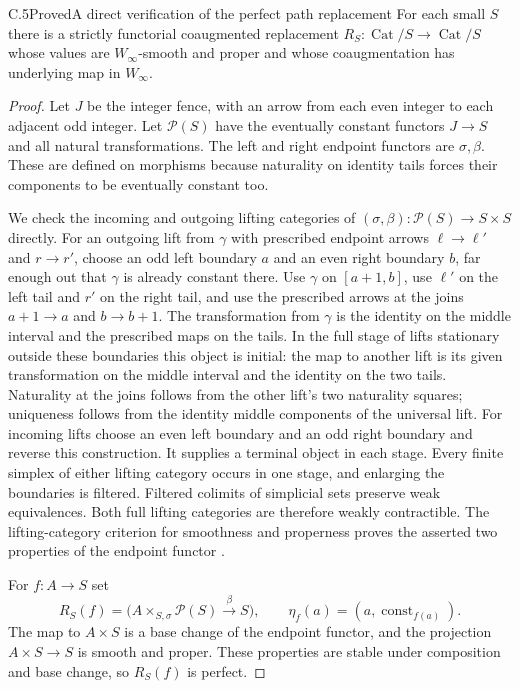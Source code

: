 \begin{claim}{C.5}{Proved}{A direct verification of the perfect path replacement}
For each small $S$ there is a strictly functorial coaugmented
replacement $R_S:\operatorname{Cat}/S\to\operatorname{Cat}/S$
whose values are $W_\infty$-smooth and proper and whose
coaugmentation has underlying map in $W_\infty$.
\end{claim}
\begin{proof}
Let $J$ be the integer fence, with an arrow from each even integer
to each adjacent odd integer. Let $\mathcal P(S)$ have the
eventually constant functors $J\to S$ and all natural transformations.
The left and right endpoint functors are $\sigma,\beta$. These
are defined on morphisms because naturality on identity tails
forces their components to be eventually constant too.

We check the incoming and outgoing lifting categories of
$(\sigma,\beta):\mathcal P(S)\to S\times S$ directly. For an
outgoing lift from $\gamma$ with prescribed endpoint arrows
$\ell\to\ell'$ and $r\to r'$, choose an odd left boundary $a$
and an even right boundary $b$, far enough out that $\gamma$
is already constant there. Use $\gamma$ on $[a+1,b]$, use
$\ell'$ on the left tail and $r'$ on the right tail, and use
the prescribed arrows at the joins $a+1\to a$ and $b\to b+1$.
The transformation from $\gamma$ is the identity on the middle
interval and the prescribed maps on the tails. In the full
stage of lifts stationary outside these boundaries this object
is initial: the map to another lift is its given transformation
on the middle interval and the identity on the two tails.
Naturality at the joins follows from the other lift's two
naturality squares; uniqueness follows from the identity middle
components of the universal lift. For incoming lifts choose
an even left boundary and an odd right boundary and reverse
this construction. It supplies a terminal object in each stage.
Every finite simplex of either lifting category occurs in one
stage, and enlarging the boundaries is filtered. Filtered
colimits of simplicial sets preserve weak equivalences.
Both full lifting categories are therefore weakly contractible.
The lifting-category criterion for smoothness and properness
proves the asserted two properties of the endpoint functor
\citep[Theorem~4.4.36(ii'), and its opposite]{RESCisinski2019}.

For $f:A\to S$ set
\[
 R_S(f)=\bigl(A\times_{S,\sigma}\mathcal P(S)
           \xrightarrow{\beta}S\bigr),
 \qquad \eta_f(a)=(a,\operatorname{const}_{f(a)}).
\]
The map to $A\times S$ is a base change of the endpoint functor,
and the projection $A\times S\to S$ is smooth and proper.
These properties are stable under composition and base change,
so $R_S(f)$ is perfect.


\end{proof}
